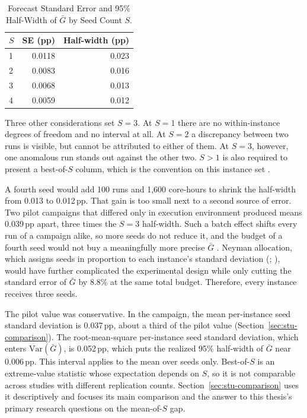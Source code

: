 \begin{table}[htbp]
\centering
\caption{Forecast Standard Error and 95\% Half-Width of $\bar G$ by Seed Count $S$.}\label{tab:seed-sizing}
\begin{tabular}{@{}lrr@{}}
\toprule
$S$ & SE (pp) & Half-width (pp) \\
\midrule
1 & 0.0118 & 0.023 \\
2 & 0.0083 & 0.016 \\
3 & 0.0068 & 0.013 \\
4 & 0.0059 & 0.012 \\
\bottomrule
\end{tabular}
\end{table}

Three other considerations set $S = 3$. At $S = 1$ there are no within-instance
degrees of freedom and no interval at all. At $S = 2$ a discrepancy between two
runs is visible, but cannot be attributed to either of them. At $S = 3$, however, one
anomalous run stands out against the other two. $S > 1$ is also required to present a best-of-$S$ column, which is the
convention on this instance set \citep{queirogaXLInstancesCapacitated2026}.

A fourth seed would add 100 runs and 1,600 core-hours to shrink the half-width
from 0.013 to 0.012\,pp. That gain is too small next to a second source of error.
Two pilot campaigns that differed only in execution environment produced means
0.039\,pp apart, three times the $S = 3$ half-width. Such a batch effect shifts
every run of a campaign alike, so more seeds do not reduce it, and the budget of
a fourth seed would not buy a meaningfully more precise $\bar{G}$
\citep{barrDesigningReportingComputational1995,johnsonTheoreticiansGuideExperimental2002}.
Neyman allocation, which assigns seeds in proportion to each instance's standard
deviation (\citealp[pp.~97--98]{cochranSamplingTechniques1977}; \citealp{neymanTwoDifferentAspects1934}), would have further complicated the experimental design while only cutting the standard error of $\bar{G}$ by 8.8\% at the same total budget. Therefore, every instance receives
three seeds.

The pilot value was conservative. In the campaign, the mean per-instance seed
standard deviation is 0.037\,pp, about a third of the pilot value
(Section~\ref{sec:stu-comparison}). The root-mean-square per-instance seed
standard deviation, which enters $\mathrm{Var}(\bar G)$, is 0.052\,pp, which
puts the realized 95\% half-width of $\bar G$ near 0.006\,pp. This
interval applies to the mean over seeds only. Best-of-$S$ is an extreme-value
statistic whose expectation depends on $S$, so it is not comparable across
studies with different replication counts. Section~\ref{sec:stu-comparison} uses
it descriptively and focuses its main comparison and the answer to this thesis's primary research questions on the mean-of-$S$ gap.

